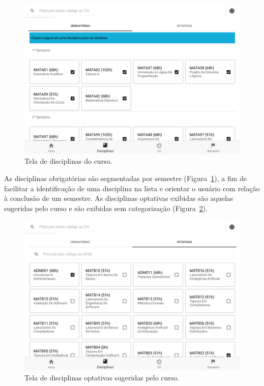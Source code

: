 \begin{figure}[H]
	   \centering
	   		\includegraphics[scale=0.25]{pics/c3/5-disciplines.png}
	   \caption{Tela de disciplinas do curso.}
	   \label{disciplines}
\end{figure}

As disciplinas obrigatórias são segmentadas por semestre (Figura~\ref{disciplines}), a fim de facilitar a identificação de uma disciplina na lista e orientar o usuário com relação à conclusão de um semestre.
As disciplinas optativas exibidas são aquelas sugeridas pelo curso e são exibidas sem categorização (Figura~\ref{optionals}).

\begin{figure}[H]
	   \centering
	   		\includegraphics[scale=0.25]{pics/c3/6-optionals.png}
	   \caption{Tela de disciplinas optativas sugeridas pelo curso.}
	   \label{optionals}
\end{figure}

